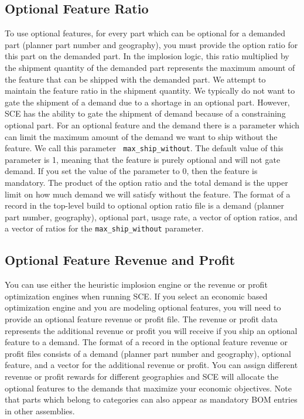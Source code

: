 \subsection{Optional Feature Ratio}
To use optional features, for every part which can be optional for a
demanded part (planner part number and geography), you must provide
the option ratio for this part on the demanded part.  In the implosion
logic, this ratio multiplied by the shipment quantity of the demanded
part represents the maximum amount of the feature that can be shipped
with the demanded part.  We attempt to maintain the feature ratio in
the shipment quantity.  We typically do not want to gate the shipment
of a demand due to a shortage in an optional part.  However, SCE has
the ability to gate the shipment of demand because of a constraining
optional part.  For an optional feature and the demand there is a
parameter which can limit the maximum amount of the demand we want to
ship without the feature.  We call this parameter {\tt
max\_ship\_without}.  The default value of this parameter is 1,
meaning that the feature is purely optional and will not gate demand.
If you set the value of the parameter to 0, then the feature is
mandatory.  The product of the option ratio and the total demand is
the upper limit on how much demand we will satisfy without the
feature.  The format of a record in the top-level build to optional
option ratio file is a demand (planner part number, geography),
optional part, usage rate, a vector of option ratios, and a vector of
ratios for the {\tt max\_ship\_without} parameter.

\subsection{Optional Feature Revenue and Profit}
You can use either the heuristic implosion engine or the revenue or
profit optimization engines when running SCE.  If you select an
economic based optimization engine and you are modeling optional
features, you will need to provide an optional feature revenue or
profit file.  The revenue or profit data represents the additional
revenue or profit you will receive if you ship an optional feature to
a demand.  The format of a record in the optional feature revenue or
profit files consists of a demand (planner part number and geography),
optional feature, and a vector for the additional revenue or profit.
You can assign different revenue or profit rewards for different
geographies and SCE will allocate the optional features to the demands
that maximize your economic objectives. Note that parts which belong
to categories can also appear as mandatory BOM entries in other
assemblies.

